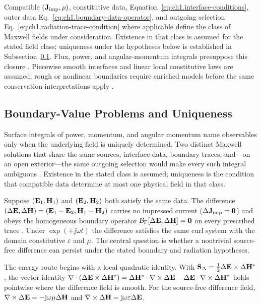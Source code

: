 Compatible $(\mathbf{J}_{\mathrm{imp}},\rho)$, constitutive data, Equation~\eqref{eq:ch1.interface-conditions}, outer data Eq.~\eqref{eq:ch1.boundary-data-operator}, and outgoing selection Eq.~\eqref{eq:ch1.radiation-trace-condition} where applicable define the class of Maxwell fields under consideration. Existence in that class is assumed for the stated field class; uniqueness under the hypotheses below is established in Subsection~\ref{sec:ch01.1.3}. Flux, power, and angular-momentum integrals presuppose this closure \cite{maxwell1873,stratton1941}. Piecewise smooth interfaces and linear local constitutive laws are assumed; rough or nonlinear boundaries require enriched models before the same conservation interpretations apply \cite{stratton1941}.

\subsection{Boundary-Value Problems and Uniqueness}
\label{sec:ch01.1.3}

Surface integrals of power, momentum, and angular momentum name observables only when the underlying field is uniquely determined. Two distinct Maxwell solutions that share the same sources, interface data, boundary traces, and---on an open exterior---the same outgoing selection would make every such integral ambiguous \cite{stratton1941,sommerfeld1949}. Existence in the stated class is assumed; uniqueness is the condition that compatible data determine at most one physical field in that class.

Suppose $(\mathbf{E}_1,\mathbf{H}_1)$ and $(\mathbf{E}_2,\mathbf{H}_2)$ both satisfy the same data. The difference $(\Delta\mathbf{E},\Delta\mathbf{H})=(\mathbf{E}_1-\mathbf{E}_2,\mathbf{H}_1-\mathbf{H}_2)$ carries no impressed current ($\Delta\mathbf{J}_{\mathrm{imp}}=\mathbf{0}$) and obeys the homogeneous boundary operator $\mathcal{B}_\Gamma[\Delta\mathbf{E},\Delta\mathbf{H}]=\mathbf{0}$ on every prescribed trace \cite{stratton1941}. Under $\exp(+\jj\omega t)$ the difference satisfies the same curl system with the domain constitutive $\varepsilon$ and $\mu$. The central question is whether a nontrivial source-free difference can persist under the stated boundary and radiation hypotheses.

The energy route begins with a local quadratic identity. With $\mathbf{S}_\Delta=\tfrac12\Delta\mathbf{E}\times\Delta\mathbf{H}^*$, the vector identity
$\nabla\cdot(\Delta\mathbf{E}\times\Delta\mathbf{H}^*)=\Delta\mathbf{H}^*\cdot\nabla\times\Delta\mathbf{E}-\Delta\mathbf{E}\cdot\nabla\times\Delta\mathbf{H}^*$
holds pointwise where the difference field is smooth. For the source-free difference field, $\nabla\times\Delta\mathbf{E}=-\mathrm{j}\omega\mu\Delta\mathbf{H}$ and $\nabla\times\Delta\mathbf{H}=\mathrm{j}\omega\varepsilon\Delta\mathbf{E}$.

